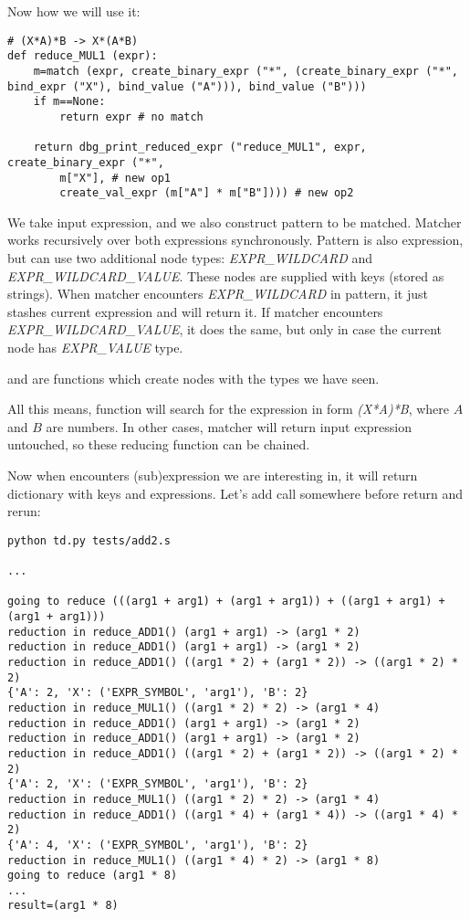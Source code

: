 Now how we will use it:

\begin{lstlisting}
# (X*A)*B -> X*(A*B)
def reduce_MUL1 (expr):
    m=match (expr, create_binary_expr ("*", (create_binary_expr ("*", bind_expr ("X"), bind_value ("A"))), bind_value ("B")))
    if m==None:
        return expr # no match

    return dbg_print_reduced_expr ("reduce_MUL1", expr, create_binary_expr ("*", 
        m["X"], # new op1
        create_val_expr (m["A"] * m["B"]))) # new op2
\end{lstlisting}

We take input expression, and we also construct pattern to be matched.
Matcher works recursively over both expressions synchronously.
Pattern is also expression, but can use two additional node types: \textit{EXPR\_WILDCARD} and
\textit{EXPR\_WILDCARD\_VALUE}. These nodes are supplied with keys (stored as strings).
When matcher encounters \textit{EXPR\_WILDCARD} in pattern, it just stashes current expression and will return it.
If matcher encounters \textit{EXPR\_WILDCARD\_VALUE}, it does the same, but only in case the current node
has \textit{EXPR\_VALUE} type.

 and  are functions which create nodes with the types we have seen.

All this means,  function will search for the expression in form \textit{(X*A)*B}, where $A$ and $B$
are numbers. In other cases, matcher will return input expression untouched, so these reducing function can be chained.

Now when  encounters (sub)expression we are interesting in,
it will return dictionary with keys and expressions.
Let's add  call somewhere before return and rerun:

\begin{lstlisting}
python td.py tests/add2.s

...

going to reduce (((arg1 + arg1) + (arg1 + arg1)) + ((arg1 + arg1) + (arg1 + arg1)))
reduction in reduce_ADD1() (arg1 + arg1) -> (arg1 * 2)
reduction in reduce_ADD1() (arg1 + arg1) -> (arg1 * 2)
reduction in reduce_ADD1() ((arg1 * 2) + (arg1 * 2)) -> ((arg1 * 2) * 2)
{'A': 2, 'X': ('EXPR_SYMBOL', 'arg1'), 'B': 2}
reduction in reduce_MUL1() ((arg1 * 2) * 2) -> (arg1 * 4)
reduction in reduce_ADD1() (arg1 + arg1) -> (arg1 * 2)
reduction in reduce_ADD1() (arg1 + arg1) -> (arg1 * 2)
reduction in reduce_ADD1() ((arg1 * 2) + (arg1 * 2)) -> ((arg1 * 2) * 2)
{'A': 2, 'X': ('EXPR_SYMBOL', 'arg1'), 'B': 2}
reduction in reduce_MUL1() ((arg1 * 2) * 2) -> (arg1 * 4)
reduction in reduce_ADD1() ((arg1 * 4) + (arg1 * 4)) -> ((arg1 * 4) * 2)
{'A': 4, 'X': ('EXPR_SYMBOL', 'arg1'), 'B': 2}
reduction in reduce_MUL1() ((arg1 * 4) * 2) -> (arg1 * 8)
going to reduce (arg1 * 8)
...
result=(arg1 * 8)
\end{lstlisting}

